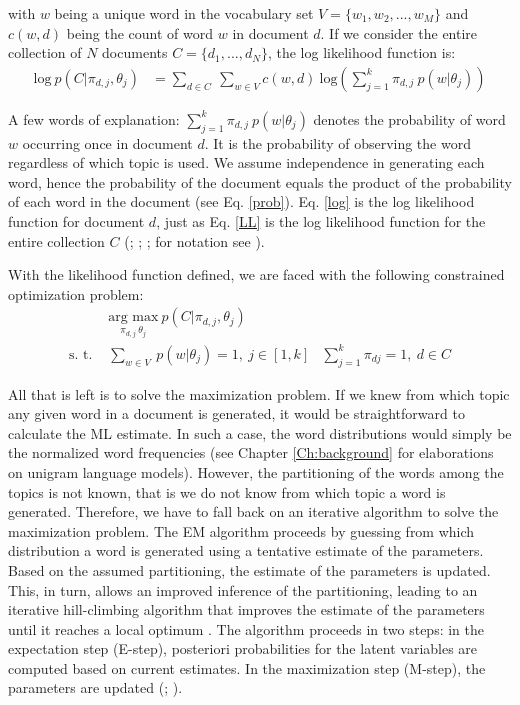 \documentclass[11pt,a4paper,english,oneside]{book}
\numberwithin{equation}{chapter}
\begin{document}
\noindent with $w$ being a unique word in the vocabulary set $V = \{w_1, w_2, ..., w_M\}$ and $c(w,d)$ being the count of word $w$ in document $d$. If we consider the entire collection of $N$ documents $C=\{d_1,...,d_N\}$, the log likelihood function is:
\begin{align}
\label{LL} \text{log} \ p(C|\pi_{d,j},\theta_j) &= \underset{d \in C}{\sum} \ \underset{w \in V}\sum c(w,d) \ \text{log} \left( \sum_{j=1}^{k}\pi_{d,j} \ p(w|\theta_j) \right)
\end{align}


A few words of explanation: $\sum_{j=1}^{k}\pi_{d,j} \ p(w|\theta_j)$ denotes the probability of word $w$ occurring once in document $d$. It is the probability of observing the word regardless of which topic is used. We assume independence in generating each word, hence the probability of the document equals the product of the probability of each word in the document (see Eq. \ref{prob}). Eq. \ref{log} is the log likelihood function for document $d$, just as Eq. \ref{LL} is the log likelihood function for the entire collection $C$ (\citealp{Hofmann.1999}; \citeyear{Hofmann.2001}; \citealp{Steyvers(2007)}; for notation see \citealp[~pp. 340--377]{Zhai.2016}).

With the likelihood function defined, we are faced with the following constrained optimization problem:
\begin{align}\label{argmax}
 & \underset{\pi_{d,j} \ \theta_j}{\text{arg max}} \ p(C|\pi_{d,j},\theta_j) &\\
\label{constraints} \text{s. t. } & \underset{w \in V}{\sum} \ p(w | \theta_j) = 1, \  j \in [1,k] &  \sum_{j=1}^{k} \pi_{dj} = 1, \ d \in C
\end{align}

All that is left is to solve the maximization problem. If we knew from which topic any given word in a document is generated, it would be straightforward to calculate the ML estimate. In such a case, the word distributions would simply be the normalized word frequencies (see Chapter \ref{Ch:background} for elaborations on unigram language models). However, the partitioning of the words among the topics is not known, that is we do not know from which topic a word is generated. Therefore, we have to fall back on an iterative algorithm to solve the maximization problem. The EM algorithm proceeds by guessing from which distribution a word is generated using a tentative estimate of the parameters. Based on the assumed partitioning, the estimate of the parameters is updated. This, in turn, allows an improved inference of the partitioning, leading to an iterative hill-climbing algorithm that improves the estimate of the parameters until it reaches a local optimum \cite[p. 360]{Zhai.2016}. The algorithm proceeds in two steps: in the expectation step (E-step), posteriori probabilities for the latent variables are computed based on current estimates. In the maximization step (M-step), the parameters are updated (\citealp[p. 290]{Hofmann.1999}; \citeyear[pp. 181--182]{Hofmann.1999}). 
\end{document}
